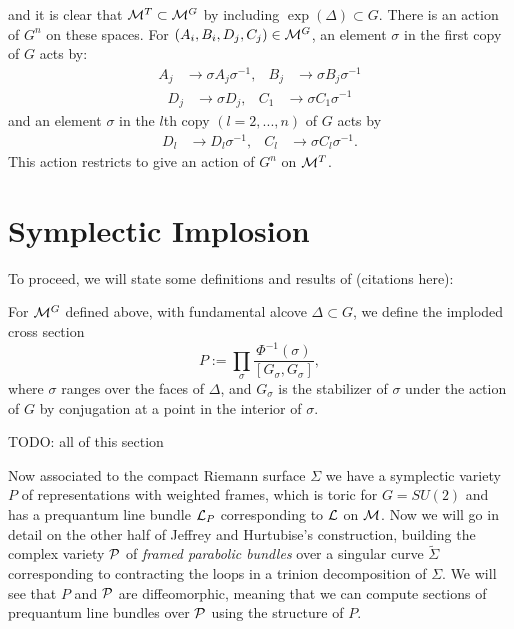 	and it is clear that $\mathcal{M}^T \subset \mathcal{M}^G$ by including $\exp(\Delta)\subset G$. There is an action of $G^n$ on these spaces. For $(A_i,B_i,D_j,C_j)\in \mathcal{M}^G$, an element $\sigma$ in the first copy of $G$ acts by:
	\begin{align*}
		A_j &\to \sigma A_j \sigma^{-1},& 	B_j&\to \sigma B_j\sigma^{-1}
	\end{align*}
	\begin{align*}
		D_j&\to \sigma D_j, & C_1 &\to \sigma C_1\sigma^{-1}
	\end{align*}
	and an element $\sigma$ in the $l$th copy $(l=2,...,n)$ of $G$ acts by
	\begin{align*}
	D_l&\to D_l\sigma^{-1}, & C_l &\to \sigma C_l\sigma^{-1}.
	\end{align*}
	This action restricts to give an action of $G^n$ on $\mathcal{M}^T$. 
	
	\section{Symplectic Implosion}
	To proceed, we will state some definitions and results of (citations here):
	
	
	\begin{definition}
		For $\mathcal{M}^G$ defined above, with fundamental alcove $\Delta\subset G$, we define the imploded cross section 
		\begin{equation}
			P := \prod_{\sigma} \frac{\Phi^{-1}(\sigma)}{[G_\sigma, G_\sigma]},
		\end{equation}
		where $\sigma$ ranges over the faces of $\Delta$, and $G_\sigma$ is the stabilizer of $\sigma$ under the action of $G$ by conjugation at a point in the interior of $\sigma$.
	\end{definition}
	TODO: all of this section \pagebreak
	

	
	Now associated to the compact Riemann surface $\Sigma$ we have a symplectic variety $P$ of representations with weighted frames, which is toric for $G=SU(2)$ and has a prequantum line bundle $\mathcal{L}_P$ corresponding to $\mathcal{L}$ on $\mathcal{M}$. Now we will go in detail on the other half of Jeffrey and Hurtubise's construction, building the complex variety $\mathcal{P}$ of \emph{framed parabolic bundles} over a singular curve $\tilde{\Sigma}$ corresponding to contracting the loops in a trinion decomposition of $\Sigma$. We will see that $P$ and $\mathcal{P}$ are diffeomorphic, meaning that we can compute sections of prequantum line bundles over $\mathcal{P}$ using the structure of $P$.
	
